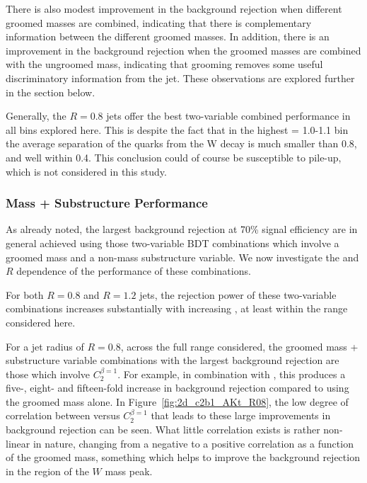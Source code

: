 
There is also modest improvement in
the background rejection when different groomed masses are combined,
 indicating that there is complementary information between the
different groomed masses. In addition, there is an improvement in the
background rejection when the groomed masses are combined with the
ungroomed mass, indicating that grooming removes some useful
discriminatory information from the jet. These observations are
explored further in the section below.

Generally, the $R=0.8$ jets offer the best two-variable
combined performance in all \pt bins explored here. This is despite
the fact that in the highest \pt = 1.0-1.1 \TeV bin the average
separation of the quarks from the W decay is much smaller than 0.8,
and well within 0.4. This conclusion could of course be susceptible to
pile-up, which is not considered in this study.

\subsubsection{Mass + Substructure Performance}

As already noted, the largest background rejection at 70\% signal
efficiency are in general achieved using those two-variable BDT combinations
which involve a groomed mass and a non-mass substructure variable. We now investigate
the \pt and $R$ dependence of the performance of these combinations.

For both $R=0.8$ and $R=1.2$ jets, the rejection power of these two-variable
combinations increases substantially with increasing \pt, at least
within the \pt range considered here.

For a jet radius of $R=0.8$, across the full \pt range considered, the
groomed mass + substructure variable combinations with the
largest background rejection are those which
involve $C_2^{\beta=1}$. For example, in combination with
\msd, this produces a five-, eight- and fifteen-fold
increase in background rejection compared to using the groomed mass
alone. In Figure~\ref{fig:2d_c2b1_AKt_R08}, the low degree of
correlation between \msd versus $C_2^{\beta=1}$ that
leads to these large improvements in background rejection can be
seen. What little correlation exists is rather
non-linear in nature, changing from a negative to a positive
correlation as a function of the groomed mass, something which helps
to improve the background rejection in the region of the $W$ mass peak.

